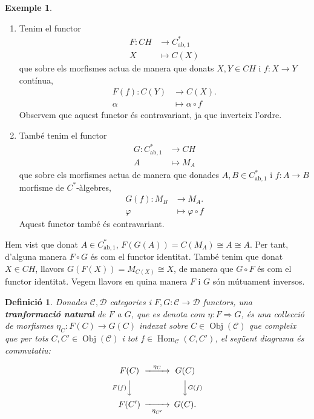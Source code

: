 \documentclass{article}
\newtheorem{definicio}{Definici\'{o}}
\theoremstyle{definition}
\newtheorem{exemple}{Exemple}
\DeclareMathOperator{\Obj}{Obj}
\DeclareMathOperator{\Hom}{Hom}
\begin{document}
\begin{exemple}
\begin{enumerate}
\item Tenim el functor
\begin{align*}
F:CH&\longrightarrow C_{\text{ab},1}^*\\
X&\longmapsto C(X)
\end{align*}
que sobre els morfismes actua de manera que donats $X,Y\in CH$ i $f:X\rightarrow Y$ cont\'{i}nua,
\begin{align*}
F(f):C(Y)&\longrightarrow C(X).\\
\alpha&\longmapsto\alpha\circ f
\end{align*}
Observem que aquest functor \'{e}s contravariant, ja que inverteix l'ordre.
\item Tamb\'{e} tenim el functor
\begin{align*}
G:C_{\text{ab},1}^*&\longrightarrow CH\\
A&\longmapsto M_A
\end{align*}
que sobre els morfismes actua de manera que donades $A,B\in C_{\text{ab},1}^*$ i $f:A\rightarrow B$ morfisme de $C^*$-\`{a}lgebres,
\begin{align*}
G(f):M_B&\longrightarrow M_A.\\
\varphi&\longmapsto\varphi\circ f
\end{align*}
Aquest functor tamb\'{e} \'{e}s contravariant.
\end{enumerate}
\end{exemple}

Hem vist que donat $A\in C_{\text{ab},1}^*$, $F(G(A))=C(M_A)\cong A\cong A$. Per tant, d'alguna manera $F\circ G$ \'{e}s com el functor identitat. Tamb\'{e} tenim que donat $X\in CH$, llavors $G(F(X))=M_{C(X)}\cong X$, de manera que $G\circ F$ \'{e}s com el functor identitat. Vegem llavors en quina manera $F$ i $G$ s\'{o}n m\'{u}tuament inversos.

\begin{definicio}
Donades $\mathcal{C},\mathcal{D}$ categories i $F,G:\mathcal{C}\rightarrow\mathcal{D}$ functors, una \textbf{tranformaci\'{o} natural} de $F$ a $G$, que es denota com $\eta:F\Rightarrow G$, \'{e}s una col\textperiodcentered lecci\'{o} de morfismes $\eta_C:F(C)\rightarrow G(C)$ indexat sobre $C\in\Obj(\mathcal{C})$ que compleix que per tots $C,C'\in\Obj(\mathcal{C})$ i tot $f\in\Hom_{\mathcal{C}}(C,C')$, el seg\"{u}ent diagrama \'{e}s commutatiu:

\[\begin{CD}F(C)@>\eta_C>>G(C)\\@VF(f)VV@VVG(f)V\\F(C')@>>\eta_{C'}>G(C).\end{CD}\]
\end{definicio}
\end{document}
